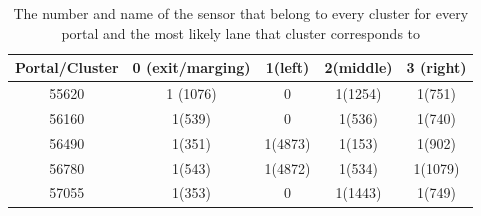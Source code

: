 	\begin{table}[H]
		\centering
		\caption{The number and name of the sensor that belong to every cluster for every portal and the most likely lane that cluster corresponds to}
		\label{tab:cluster}
		\begin{tabular}{c|cccc}
			Portal/Cluster & 0 (exit/marging) & 1(left) & 2(middle) & 3 (right) \\
			\hline 
			55620          & 1 (1076)         & 0       & 1(1254)   & 1(751)    \\
			56160          & 1(539)           & 0       & 1(536)    & 1(740)    \\
			56490          & 1(351)           & 1(4873) & 1(153)    & 1(902)    \\
			56780          & 1(543)           & 1(4872) & 1(534)    & 1(1079)   \\
			57055          & 1(353)           & 0       & 1(1443)   & 1(749)   
		\end{tabular}
	\end{table}
